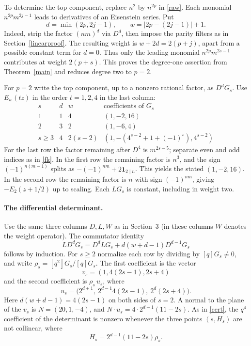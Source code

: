 \documentclass[11pt]{article}
\begin{document}
To determine the top component, replace $n^2$ by $n^{2p}$ in \eqref{raw}. Each monomial $n^{2p}m^{2j-1}$ leads to derivatives of an Eisenstein series. Put
\[
 d=\min(2p,2j-1),\qquad w=|2p-(2j-1)|+1 .
\]
Indeed, strip the factor $(nm)^d$ via $D^d$, then impose the parity filters as in Section~\ref{linearproof}. The resulting weight is $w+2d=2(p+j)$, apart from a possible constant term for $d=0$. Thus only the leading monomial $n^{2p}m^{2s-1}$ contributes at weight $2(p+s)$. This proves the degree-one assertion from Theorem~\ref{main} and reduces degree two to $p=2$.

For $p=2$ write the top component, up to a nonzero rational factor, as $D^d G_s$. Use $E_w(tz)$ in the order $t=1,2,4$ in the last column:
\[
\begin{array}{c|c|c|c}
 s & d & w &\text{coefficients of }G_s\\ \hline
 1 &1&4&(1,-2,16)\\
 2 &3&2&(1,-6,4)\\
 s\ge3 &4&2(s-2)&(1,-(4^{s-2}+1+(-1)^s),4^{s-2})
\end{array}
\]
For the last row the factor remaining after $D^4$ is $m^{2s-5}$; separate even and odd indices as in \eqref{fk}. In the first row the remaining factor is $n^3$, and the sign $(-1)^{n(m-1)}$ splits as $-(-1)^{nm}+2\boldsymbol1_{2\mid n}$. This yields the stated $(1,-2,16)$. In the second row the remaining factor is $n$ with sign $(-1)^{nm}$, giving $-E_2(z+1/2)$ up to scaling. Each $LG_s$ is constant, including in weight two.

\paragraph{The differential determinant.}
Use the same three columns $D,L,W$ as in Section~3 (in these columns $W$ denotes the weight operator). The commutator identity
\[
 LD^d G_s=D^d LG_s+d(w+d-1)D^{d-1}G_s
\]
follows by induction. For $s\ge2$ normalize each row by dividing by $[q]G_s\ne0$, and write $\rho_s=[q^2]G_s/[q]G_s$. The first coefficient is the vector
\[
 v_s=(1,4(2s-1),2s+4)
\]
and the second coefficient is $\rho_s\, u_s$, where
\[
 u_s=\bigl(2^{d+1},\ 2^{d-1}4(2s-1),\ 2^d(2s+4)\bigr).
\]
Here $d(w+d-1)=4(2s-1)$ on both sides of $s=2$. A normal to the plane of the $v_s$ is $N=(20,1,-4)$, and $N\cdot u_s=4\cdot 2^{d-1}(11-2s)$. As in \eqref{cert}, the $q^4$ coefficient of the determinant is nonzero whenever the three points $(s,H_s)$ are not collinear, where
\[
 H_s=2^{d-1}(11-2s)\rho_s.
\]
\end{document}
